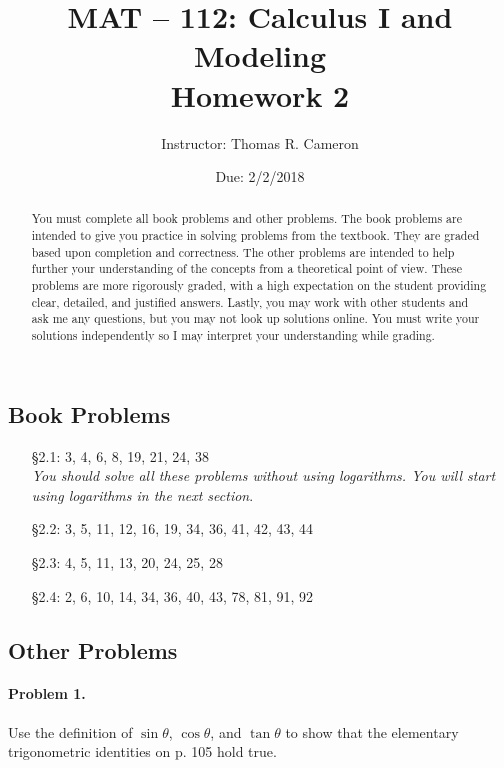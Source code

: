 \documentclass{article}
\title{MAT -- 112: Calculus I and Modeling\\
\large{Homework 2}}
\author{Instructor: Thomas R. Cameron}
\date{Due: 2/2/2018}
\begin{document}
\maketitle

\begin{abstract}
You must complete all book problems and other problems. The book problems are intended to give you practice in solving problems from the textbook. They are graded based upon completion and correctness. The other problems are intended to help further your understanding of the concepts from a theoretical point of view. These problems are more rigorously graded, with a high expectation on the student providing clear, detailed, and justified answers. Lastly, you may work with other students and ask me any questions, but you may not look up solutions online. You must write your solutions independently so I may interpret your understanding while grading. 
\end{abstract}

\subsection*{Book Problems}
\begin{itemize}
\item   [\S 2.1:] 3, 4, 6, 8, 19, 21, 24, 38 \\
\emph{You should solve all these problems without using logarithms. You will start using logarithms in the next section}. 
\item   [\S 2.2:] 3, 5, 11, 12, 16, 19, 34, 36, 41, 42, 43, 44
\item   [\S 2.3:] 4, 5, 11, 13, 20, 24, 25, 28
\item   [\S 2.4:] 2, 6, 10, 14, 34, 36, 40, 43, 78, 81, 91, 92
\end{itemize}

\subsection*{Other Problems}

\paragraph*{Problem 1.} Use the definition of $\sin\theta$, $\cos\theta$, and $\tan\theta$ to show that the elementary trigonometric identities on p. 105 hold true. 
\end{document}
